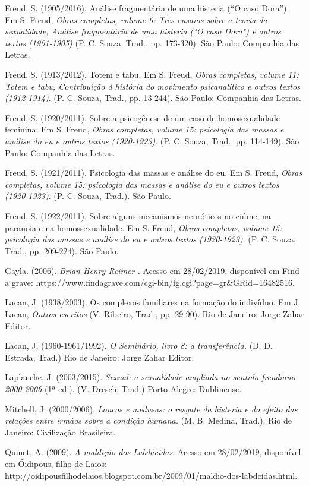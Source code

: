 Freud, S. (1905/2016). Análise fragmentária de uma histeria (``O caso
Dora''). Em S. Freud, \emph{Obras completas, volume 6: Três ensaios
sobre a teoria da sexualidade, Análise fragmentária de uma histeria ("O
caso Dora") e outros textos (1901-1905)} (P. C. Souza, Trad., pp.
173-320). São Paulo: Companhia das Letras.

Freud, S. (1913/2012). Totem e tabu. Em S. Freud, \emph{Obras completas,
volume 11: Totem e tabu, Contribuição à história do movimento
psicanalítico e outros textos (1912-1914)}. (P. C. Souza, Trad., pp.
13-244). São Paulo: Companhia das Letras.

Freud, S. (1920/2011). Sobre a psicogênese de um caso de homosexualidade
feminina. Em S. Freud, \emph{Obras completas, volume 15: psicologia das
massas e análise do eu e outros textos (1920-1923)}. (P. C. Souza,
Trad., pp. 114-149). São Paulo: Companhia das Letras.

Freud, S. (1921/2011). Psicologia das massas e análise do eu. Em S.
Freud, \emph{Obras completas, volume 15: psicologia das massas e análise
do eu e outros textos (1920-1923)}. (P. C. Souza, Trad.). São Paulo.

Freud, S. (1922/2011). Sobre alguns mecanismos neuróticos no ciúme, na
paranoia e na homossexualidade. Em S. Freud, \emph{Obras completas,
volume 15: psicologia das massas e análise do eu e outros textos
(1920-1923)}. (P. C. Souza, Trad., pp. 209-224). São Paulo.

Gayla. (2006). \emph{Brian Henry Reimer .} Acesso em 28/02/2019,
disponível em Find a grave:
https://www.findagrave.com/cgi-bin/fg.cgi?page=gr\&GRid=16482516.

Lacan, J. (1938/2003). Os complexos familiares na formação do indivíduo.
Em J. Lacan, \emph{Outros escritos} (V. Ribeiro, Trad., pp. 29-90). Rio
de Janeiro: Jorge Zahar Editor.

Lacan, J. (1960-1961/1992). \emph{O Seminário, livro 8: a
transferência.} (D. D. Estrada, Trad.) Rio de Janeiro: Jorge Zahar
Editor.

Laplanche, J. (2003/2015). \emph{Sexual: a sexualidade ampliada no
sentido freudiano 2000-2006} (1ª ed.). (V. Dresch, Trad.) Porto Alegre:
Dublinense.

Mitchell, J. (2000/2006). \emph{Loucos e medusas: o resgate da histeria
e do efeito das relações entre irmãos sobre a condição humana.} (M. B.
Medina, Trad.). Rio de Janeiro: Civilização Brasileira.

Quinet, A. (2009). \emph{A maldição dos Labdácidas}. Acesso em
28/02/2019, disponível em Óidipous, filho de Laios:
http://oidipousfilhodelaios.blogspot.com.br/2009/01/maldio-dos-labdcidas.html.

